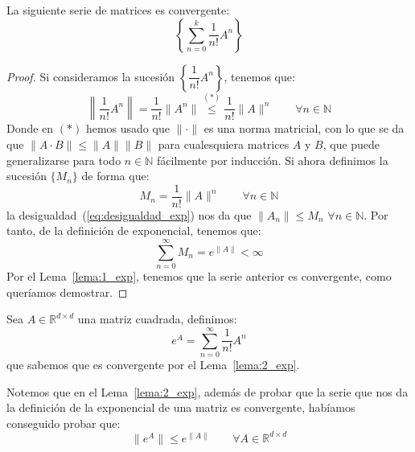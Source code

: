\begin{lema}\label{lema:2_exp}
    La siguiente serie de matrices es convergente: 
    \begin{equation*}
        \left\{\sum_{n=0}^{k}\dfrac{1}{n!}A^n\right\}
    \end{equation*}
    \begin{proof}
        Si consideramos la sucesión $\left\{\dfrac{1}{n!}A^n\right\}$, tenemos que:
        \begin{equation}\label{eq:desigualdad_exp}
            \left\|\dfrac{1}{n!}A^n\right\| = \dfrac{1}{n!} \|A^n\| \stackrel{(\ast)}{\leq }\dfrac{1}{n!}\|A\|^n \qquad \forall n\in \mathbb{N}
        \end{equation}
        Donde en $(\ast)$ hemos usado que $\|\cdot \|$ es una norma matricial, con lo que se da que $\|A\cdot B\| \leq \|A\|\|B\|$ para cualesquiera matrices $A$ y $B$, que puede generalizarse para todo $n\in \mathbb{N}$ fácilmente por inducción. Si ahora definimos la sucesión $\{M_n\}$ de forma que:
        \begin{equation*}
            M_n = \dfrac{1}{n!}\|A\|^n \qquad \forall n\in \mathbb{N}
        \end{equation*}
        la desigualdad~(\ref{eq:desigualdad_exp}) nos da que $\|A_n\|\leq M_n$ $\forall n\in \mathbb{N}$. Por tanto, de la definición de exponencial, tenemos que:
        \begin{equation*}
            \sum_{n=0}^{\infty} M_n = e^{\|A\|} < \infty
        \end{equation*}
        Por el Lema~\ref{lema:1_exp}, tenemos que la serie anterior es convergente, como queríamos demostrar.
    \end{proof}
\end{lema}

\begin{definicion}
    Sea $A\in \mathbb{R}^{d\times d}$ una matriz cuadrada, definimos:
    \begin{equation*}
        e^A = \sum_{n=0}^{\infty} \dfrac{1}{n!} A^n
    \end{equation*}
    que sabemos que es convergente por el Lema~\ref{lema:2_exp}.
\end{definicion}

\begin{observacion}
    Notemos que en el Lema~\ref{lema:2_exp}, además de probar que la serie que nos da la definición de la exponencial de una matriz es convergente, habíamos conseguido probar que:
    \begin{equation*}
        \|e^A\| \leq e^{\|A\|} \qquad \forall A\in \mathbb{R}^{d\times d}
    \end{equation*}
\end{observacion}

